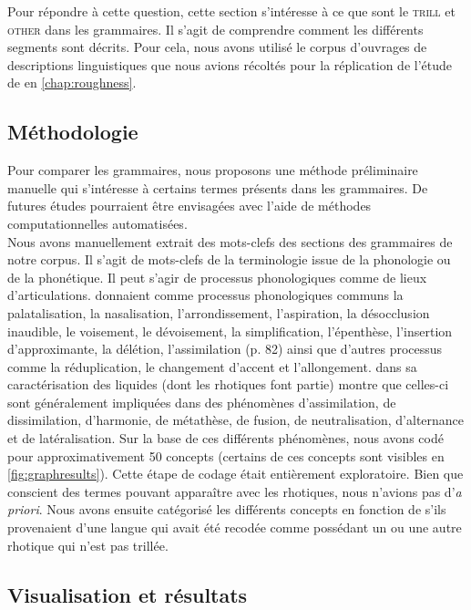 Pour répondre à cette question, cette section s'intéresse à ce que sont le \textsc{trill} et \textsc{other} dans les grammaires. Il s'agit de comprendre comment les différents segments sont décrits. Pour cela, nous avons utilisé le corpus d'ouvrages de descriptions linguistiques que nous avions récoltés pour la réplication de l'étude de \textcite{winterTrilledAssociatedRoughness2022} en \autoref{chap:roughness}.


\subsection{Méthodologie}

Pour comparer les grammaires, nous proposons une méthode préliminaire manuelle qui s'intéresse à certains termes présents dans les grammaires. De futures études pourraient être envisagées avec l'aide de méthodes computationnelles automatisées.\\

Nous avons manuellement extrait des mots-clefs des sections des grammaires de notre corpus. Il s'agit de mots-clefs de la terminologie issue de la phonologie ou de la phonétique. Il peut s'agir de processus phonologiques comme de lieux d'articulations. \textcite{vauxIntroductionLinguisticField2003} donnaient comme processus phonologiques communs la palatalisation, la nasalisation, l'arrondissement, l'aspiration, la désocclusion inaudible, le voisement, le dévoisement, la simplification, l'épenthèse, l'insertion d'approximante, la délétion, l'assimilation (p. 82) ainsi que d'autres processus comme la réduplication, le changement d'accent et l'allongement. \textcite{proctorGesturalCharacterizationPhonological2009} dans sa caractérisation des liquides (dont les rhotiques font partie) montre que celles-ci sont généralement impliquées dans des phénomènes d'assimilation, de dissimilation, d'harmonie, de métathèse, de fusion, de neutralisation, d'alternance et de latéralisation. Sur la base de ces différents phénomènes, nous avons codé pour approximativement 50 concepts (certains de ces concepts sont visibles en \autoref{fig:graphresults}). Cette étape de codage était entièrement exploratoire. Bien que conscient des termes pouvant apparaître avec les rhotiques, nous n'avions pas d'\textit{a priori}. Nous avons ensuite catégorisé les différents concepts en fonction de s'ils provenaient d'une langue qui avait été recodée comme possédant un  ou une autre rhotique qui n'est pas trillée.

\subsection{Visualisation et résultats}

